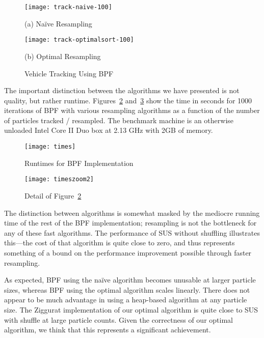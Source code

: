 \documentclass[12pt]{article}
\begin{document}
  \begin{figure}
    \begin{minipage}{0.45\linewidth}
    \centering
    \texttt{[image: track-naive-100]}
    \begin{center}\small (a) Na\"ive Resampling\label{fig-track-naive}\end{center}
    \end{minipage}
    \begin{minipage}{0.45\linewidth}
    \centering
    \texttt{[image: track-optimalsort-100]}
    \begin{center}\small (b) Optimal Resampling\label{fig-track-optimal}\end{center}
    \end{minipage}
    \caption{Vehicle Tracking Using BPF}
  \end{figure}

  The important distinction between the algorithms we have
  presented is not
  quality, but rather runtime.
  Figures~\ref{fig-times} and~\ref{fig-timeszoom2} show the time
  in seconds for 1000 iterations of BPF with various
  resampling algorithms as a function of the number of
  particles tracked / resampled.  The benchmark machine is
  an otherwise unloaded Intel Core II Duo box at 2.13 GHz
  with 2GB of memory.

  \begin{figure}
    \centering
    \texttt{[image: times]}
    \caption{Runtimes for BPF Implementation}\label{fig-times}
  \end{figure}

  \begin{figure}
    \centering
    \texttt{[image: timeszoom2]}
    \caption{Detail of Figure~\ref{fig-times}}\label{fig-timeszoom2}
  \end{figure}

  The distinction between algorithms is somewhat masked by the mediocre running
  time of the rest of the BPF implementation; resampling is
  not the bottleneck for any of these fast algorithms.  The
  performance of SUS without shuffling illustrates
  this---the cost of that algorithm is quite close to zero,
  and thus represents something of a bound on the
  performance improvement possible through faster resampling.

  As expected, BPF using the na\"ive algorithm becomes
  unusable at larger particle sizes, whereas BPF using the
  optimal algorithm scales linearly.  There does not appear
  to be much advantage in using a heap-based algorithm at
  any particle size.  The Ziggurat implementation of our
  optimal algorithm is quite close to SUS
  with shuffle at large particle counts.  Given the
  correctness of our optimal algorithm, we think that this
  represents a significant achievement.
\end{document}
